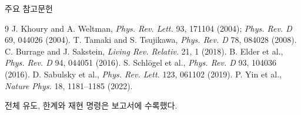 \documentclass[10pt,aspectratio=169]{beamer}
\begin{document}
\begin{frame}{주요 참고문헌}
 \footnotesize
 \begin{thebibliography}{9}
  J. Khoury and A. Weltman, \emph{Phys. Rev. Lett.} 93, 171104 (2004); \emph{Phys. Rev. D} 69, 044026 (2004).
  T. Tamaki and S. Tsujikawa, \emph{Phys. Rev. D} 78, 084028 (2008).
  C. Burrage and J. Sakstein, \emph{Living Rev. Relativ.} 21, 1 (2018).
  B. Elder et al., \emph{Phys. Rev. D} 94, 044051 (2016).
  S. Schl\"ogel et al., \emph{Phys. Rev. D} 93, 104036 (2016).
  D. Sabulsky et al., \emph{Phys. Rev. Lett.} 123, 061102 (2019).
  P. Yin et al., \emph{Nature Phys.} 18, 1181--1185 (2022).
 \end{thebibliography}
 \vfill\scriptsize 전체 유도, 한계와 재현 명령은 보고서에 수록했다.
\end{frame}
\end{document}
